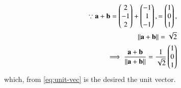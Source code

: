 \begin{align}
	\because \mathbf a + \mathbf b = \begin{pmatrix} 2\\-1\\2 \end{pmatrix} + \begin{pmatrix} -1\\1\\-1 \end{pmatrix},
= \begin{pmatrix} 1\\0\\1 \end{pmatrix},
\\
	\left\lVert\mathbf a + \mathbf b \right\rVert = \sqrt{2}
	\\
	\implies \frac{\mathbf a + \mathbf b }{\left\lVert\mathbf a + \mathbf b \right\rVert} = \frac{1}{\sqrt{2}}\begin{pmatrix} 1\\0\\1 \end{pmatrix}
\end{align}
which, from  \eqref{eq:unit-vec} is the desired the unit vector.
		




